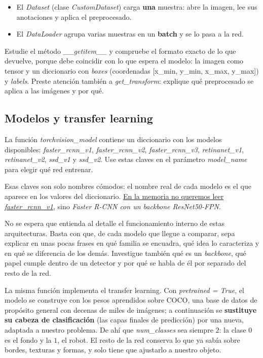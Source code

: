 \documentclass[12pt,a4paper]{article}
\begin{document}
\begin{itemize}
    \item El \textit{Dataset} (clase \textit{CustomDataset}) carga \textbf{una} muestra: abre la imagen, lee sus anotaciones y aplica el preprocesado.
    \item El \textit{DataLoader} agrupa varias muestras en un \textbf{batch} y se lo pasa a la red.
\end{itemize}

Estudie el método \textit{\_\_getitem\_\_} y compruebe el formato exacto de lo que devuelve, porque debe coincidir con lo que espera el modelo: la imagen como tensor y un diccionario con \textit{boxes} (coordenadas [x\_min, y\_min, x\_max, y\_max]) y \textit{labels}. Preste atención también a \textit{get\_transform}: explique qué preprocesado se aplica a las imágenes y por qué.

\subsection{Modelos y transfer learning}
\label{sec:semana2-models}

La función \textit{torchvision\_model} contiene un diccionario con los modelos disponibles: \textit{faster\_rcnn\_v1}, \textit{faster\_rcnn\_v2}, \textit{faster\_rcnn\_v3}, \textit{retinanet\_v1}, \textit{retinanet\_v2}, \textit{ssd\_v1} y \textit{ssd\_v2}. Use estas claves en el parámetro \textit{model\_name} para elegir qué red entrenar.

\begin{framed}
    Esas claves son solo nombres cómodos: el nombre real de cada modelo es el que aparece en los valores del diccionario. \underline{En la memoria no queremos leer \textit{faster\_rcnn\_v1}}, sino \textit{Faster R-CNN con un backbone ResNet50-FPN}.
\end{framed}

No se espera que entienda al detalle el funcionamiento interno de estas arquitecturas. Basta con que, de cada modelo que llegue a comparar, sepa explicar en unas pocas frases en qué familia se encuadra, qué idea lo caracteriza y en qué se diferencia de los demás. Investigue también qué es un \textit{backbone}, qué papel cumple dentro de un detector y por qué se habla de él por separado del resto de la red.

La misma función implementa el transfer learning. Con \textit{pretrained = True}, el modelo se construye con los pesos aprendidos sobre COCO, una base de datos de propósito general con decenas de miles de imágenes; a continuación se \textbf{sustituye su cabeza de clasificación} (las capas finales de predicción) por una nueva, adaptada a nuestro problema. De ahí que \textit{num\_classes} sea siempre $2$: la clase $0$ es el fondo y la $1$, el robot. El resto de la red conserva lo que ya sabía sobre bordes, texturas y formas, y solo tiene que ajustarlo a nuestro objeto.
\end{document}
